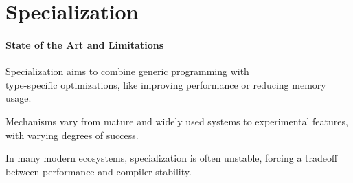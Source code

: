 \section{Specialization}\label{sec:introduction}

\begin{frame}{\secname}
	\framesubtitle{State of the Art and Limitations}

	Specialization aims to combine generic programming with \\type-specific \alert{optimizations}, like improving performance or reducing memory usage.

	\bigskip

	Mechanisms vary from mature and widely used systems %
	to experimental features, %
	with varying degrees of success.

	\bigskip

	In many modern ecosystems, specialization is often \alert{unstable}, forcing a tradeoff between performance and compiler stability.

\end{frame}